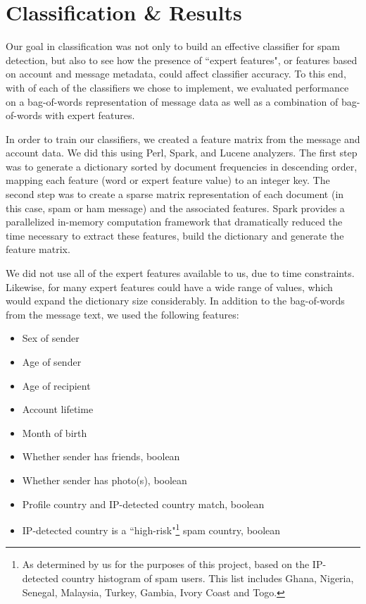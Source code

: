 \documentclass[preprint]{acm_proc_article-sp}
\begin{document}
\section{Classification \& Results}

Our goal in classification was not only to build an effective classifier for spam detection, 
but also to see how the presence of ``expert features", or features based on account and 
message metadata, could affect classifier accuracy. To this end, with of each of the classifiers 
we chose to implement, we evaluated performance on a bag-of-words representation of message data 
as well as a combination of bag-of-words with expert features.

In order to train our classifiers, we created a feature matrix from the message and account data. We did this using 
Perl, Spark, and Lucene analyzers. The first step was to generate a dictionary sorted by document frequencies in descending 
order, mapping each feature (word or expert feature value) to an integer key. The second step was to create a sparse 
matrix representation of each document (in this case, spam or ham message) and the associated features. Spark provides a 
parallelized in-memory computation framework that dramatically reduced the time necessary to extract these features, 
build the dictionary and generate the feature matrix. 

We did not use all of the expert features available to us, due to time constraints. Likewise, for many expert features could 
have a wide range of values, which would expand the dictionary size considerably. In addition to the bag-of-words from the 
message text, we used the following features:
\begin{itemize}
\item Sex of sender
\item Age of sender
\item Age of recipient
\item Account lifetime
\item Month of birth 
\item Whether sender has friends, boolean
\item Whether sender has photo(s), boolean
\item Profile country and IP-detected country match, boolean
\item IP-detected country is a ``high-risk"\footnote{As determined by us for the purposes of this project, based on 
the IP-detected country histogram of spam users. This list includes Ghana, Nigeria, Senegal, Malaysia, Turkey, 
Gambia, Ivory Coast and Togo.} spam country, boolean
\end{itemize}
\end{document}
